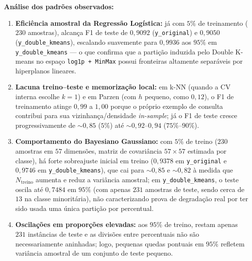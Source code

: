 \documentclass[a4paper,11pt]{article}
\begin{document}
\textbf{Análise dos padrões observados:}
\begin{enumerate}[leftmargin=1.5em, itemsep=0.25em, topsep=0.25em]
  \item \textbf{Eficiência amostral da Regressão Logística:} já com $5\%$ de treinamento ($230$ amostras), alcança F1 de teste de $0,9092$ (\texttt{y\_\allowbreak original}) e $0,9050$ (\texttt{y\_\allowbreak double\_\allowbreak kmeans}), escalando suavemente para $0,9936$ aos $95\%$ em \texttt{y\_\allowbreak double\_\allowbreak kmeans} --- o que confirma que a partição induzida pelo Double K-means no espaço \texttt{log1p + MinMax} possui fronteiras altamente separáveis por hiperplanos lineares.
  \item \textbf{Lacuna treino--teste e memorização local:} em k-NN (quando a CV interna escolhe $k=1$) e em Parzen (com $h$ pequeno, como $0,12$), o F1 de treinamento atinge $0,99$ a $1,00$ porque o próprio exemplo de consulta contribui para sua vizinhança/densidade \textit{in-sample}; já o F1 de teste cresce progressivamente de $\sim 0,85$ ($5\%$) até $\sim 0,92\text{--}0,94$ ($75\%\text{--}90\%$).
  \item \textbf{Comportamento do Bayesiano Gaussiano:} com $5\%$ de treino ($230$ amostras em $57$ dimensões, matriz de covariância $57 \times 57$ estimada por classe), há forte sobreajuste inicial em treino ($0,9378$ em \texttt{y\_\allowbreak original} e $0,9746$ em \texttt{y\_\allowbreak double\_\allowbreak kmeans}), que cai para $\sim 0,85$ e $\sim 0,82$ à medida que $N_{\text{treino}}$ aumenta e reduz a variância amostral; em \texttt{y\_\allowbreak double\_\allowbreak kmeans}, o teste oscila até $0,7484$ em $95\%$ (com apenas $231$ amostras de teste, sendo cerca de $13$ na classe minoritária), não caracterizando prova de degradação real por ter sido usada uma única partição por percentual.
  \item \textbf{Oscilações em proporções elevadas:} aos $95\%$ de treino, restam apenas $231$ instâncias de teste e as divisões entre percentuais não são necessariamente aninhadas; logo, pequenas quedas pontuais em $95\%$ refletem variância amostral de um conjunto de teste pequeno.
\end{enumerate}
\end{document}
